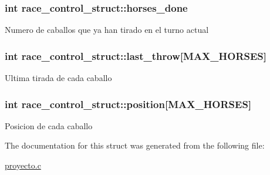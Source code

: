 \subsubsection[{\texorpdfstring{horses\+\_\+done}{horses_done}}]{\setlength{\rightskip}{0pt plus 5cm}int race\+\_\+control\+\_\+struct\+::horses\+\_\+done}\hypertarget{structrace__control__struct_a86354e834c5267f502b144c10cf45570}{}\label{structrace__control__struct_a86354e834c5267f502b144c10cf45570}
Numero de caballos que ya han tirado en el turno actual 
\subsubsection[{\texorpdfstring{last\+\_\+throw}{last_throw}}]{\setlength{\rightskip}{0pt plus 5cm}int race\+\_\+control\+\_\+struct\+::last\+\_\+throw\mbox{[}{\bf M\+A\+X\+\_\+\+H\+O\+R\+S\+ES}\mbox{]}}\hypertarget{structrace__control__struct_ad0803685a1d1a4e56e8a2af52a70ef7e}{}\label{structrace__control__struct_ad0803685a1d1a4e56e8a2af52a70ef7e}
Ultima tirada de cada caballo 
\subsubsection[{\texorpdfstring{position}{position}}]{\setlength{\rightskip}{0pt plus 5cm}int race\+\_\+control\+\_\+struct\+::position\mbox{[}{\bf M\+A\+X\+\_\+\+H\+O\+R\+S\+ES}\mbox{]}}\hypertarget{structrace__control__struct_aa99101cd69a20dcdd9f3322cf272d434}{}\label{structrace__control__struct_aa99101cd69a20dcdd9f3322cf272d434}
Posicion de cada caballo 

The documentation for this struct was generated from the following file\+:\begin{DoxyCompactItemize}
\item 
\hyperlink{proyecto_8c}{proyecto.\+c}\end{DoxyCompactItemize}
